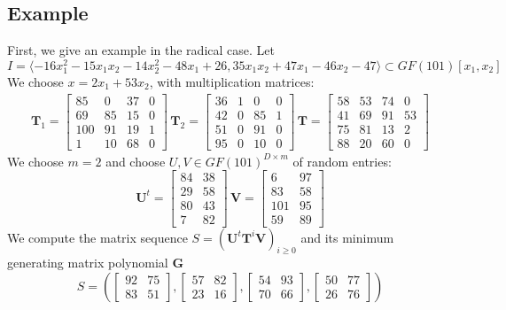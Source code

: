 \documentclass[12pt]{article}
\def\mG{\mathbf{G}}
\def\mT{\mathbf{T}}
\def\mU{\mathbf{U}}
\def\mV{\mathbf{V}}
\begin{document}
\subsection{Example}
First, we give an example in the radical case. Let
$$I = \langle -16x_1^2 - 15x_1x_2 - 14x_2^2 - 48x_1 + 26, 35x_1x_2 + 47x_1 - 46x_2 - 47 \rangle \subset GF(101)[x_1,x_2]$$
We choose $x = 2x_1 + 53 x_2$, with multiplication matrices:
\begin{align*}
\mT_1 = \begin{bmatrix}
 85&   0&  37&   0\\
 69&  85&  15&   0\\
100&  91&  19&   1\\
  1&  10&  68&   0
\end{bmatrix}\,
\mT_2 = \begin{bmatrix}
36&  1&  0&  0\\
42&  0& 85&  1\\
51&  0& 91&  0\\
95&  0& 10&  0
\end{bmatrix}\,
\mT = \begin{bmatrix}
58& 53& 74&  0\\
41& 69& 91& 53\\
75& 81& 13&  2\\
88& 20& 60&  0
\end{bmatrix}
\end{align*}
We choose $m = 2$ and choose $U,V \in GF(101)^{D\times m}$ of random
entries:
$$ \mU^t = \begin{bmatrix}
84& 38\\
29& 58\\
80& 43\\
 7& 82
\end{bmatrix}\,
\mV = \begin{bmatrix}
  6&  97\\
 83&  58\\
101&  95\\
 59&  89
\end{bmatrix}
$$
We compute the matrix sequence $S = (\mU^t\mT^i\mV)_{i\ge0}$ and its minimum generating matrix polynomial $\mG$
$$ S = (
\begin{bmatrix}
92& 75\\  
83& 51
\end{bmatrix},
\begin{bmatrix}
57& 82\\  
23& 16
\end{bmatrix},
\begin{bmatrix}
54& 93\\  
70& 66
\end{bmatrix},
\begin{bmatrix}
50& 77\\
26& 76
\end{bmatrix}
)$$
\end{document}
